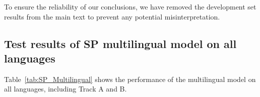 \documentclass[11pt]{article}
\begin{document}
To ensure the reliability of our conclusions, we have removed the development set results from the main text to prevent any potential misinterpretation.

\subsection{Test results of SP multilingual model on all languages}
\label{sec:app_SP_Multilingual}

Table~\ref{tab:SP_Multilingual} shows the performance of the multilingual model on all languages, including Track A and B.

\end{document}
